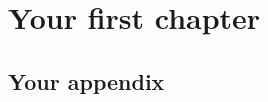 \documentclass[]{msu-thesis}
\begin{document}
\chapter{Your first chapter}
%
%
%
%
%
\begin{appendix}
\chapter{Your appendix}
\end{appendix}
%
%
%
%
\backmatter
%
%
\makebibliographypage %
%
%
%
%
%
\end{document}
